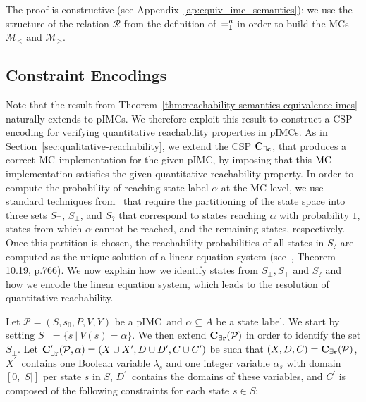 \documentclass{llncs}
\newcommand{\mc}{\textnormal{MC}}
\newcommand{\pimc}{\textnormal{pIMC}}
\newcommand{\csp}{\textnormal{CSP}}
\newcommand{\satisfactionImc}{\ensuremath{\models^{a}_{\tt{I}}}}
\newcommand{\Mec} {\ensuremath{{\bf C_{{\exists}c}}}}
\newcommand{\Mer}{\ensuremath{{\bf C_{{\exists}r}}}}
\newcommand{\MerPrime}{\ensuremath{{\bf C^{\prime}_{{\exists}r}}}}
\begin{document}
The proof is constructive (see 
Appendix~\ref{ap:equiv_imc_semantics}): we use the structure of the relation $\mathcal{R}$ from the
definition of $\satisfactionImc$ in order to build the {\mc}s
$\mathcal{M}_{\le}$ and $\mathcal{M}_{\ge}$.


\subsection{Constraint Encodings}

Note that the result from
Theorem~\ref{thm:reachability-semantics-equivalence-imcs} naturally
extends to {\pimc}s. We therefore exploit this result to construct a
{\csp} encoding for verifying quantitative reachability properties in
{\pimc}s.
%
As in Section~\ref{sec:qualitative-reachability}, we extend the
CSP $\Mec$, that produces a correct $\mc$ implementation for the given
{\pimc}, by imposing that this $\mc$ implementation satisfies the
given quantitative reachability property. In order to compute the
probability of reaching state label $\alpha$ at the {\mc} level, we
use standard techniques from~\cite{Baier2008PMC} that require the
partitioning of the state space into three sets $S_{\top}$,
$S_{\bot}$, and $S_?$ that correspond to states reaching
$\alpha$ with probability $1$, states from which $\alpha$ cannot be
reached, and the remaining states, respectively. Once this partition is chosen, the
reachability probabilities of all states in $S_?$ are computed as the
unique solution of a linear equation system (see~\cite{Baier2008PMC},
Theorem 10.19, p.766). We now explain how we identify states from
$S_\bot, S_\top$ and $S_?$ and how we encode the
linear equation system, which leads to the resolution of quantitative
reachability.



Let $\mathcal{P} = (S,s_0,P,V,Y)$ be a \pimc\ and $\alpha \subseteq
A$ be a state label. We start by setting $S_\top = \{s \ |\ V(s) =
\alpha\}$. We then extend $\Mer(\mathcal{P})$ in order to identify the
set $S_\bot$. Let $\MerPrime(\mathcal{P}, \alpha) = (X \cup X^\prime,D
\cup D^\prime,C \cup C^\prime)$ be such that $(X,D,C) =
\Mer(\mathcal{P})$, $X^\prime$~contains one Boolean variable
$\lambda_s$ and one integer variable $\alpha_s$ with domain $[0, |S|]$
per state $s$ in $S$, $D^\prime$~contains the domains of these
variables, and $C^\prime$ is composed of the following constraints for
each state $s \in S$:
\end{document}
